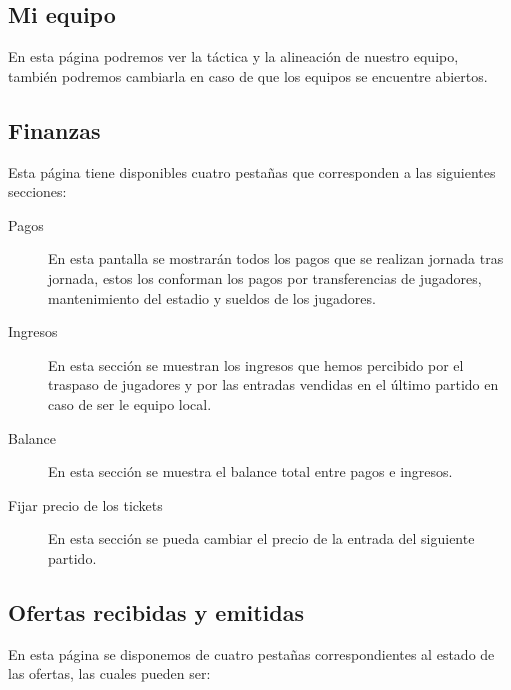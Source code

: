 \subsection{Mi equipo}
\label{sec:mi_equipo}
En esta página podremos ver la táctica y la alineación de nuestro equipo,
también podremos cambiarla en caso de que los equipos se encuentre abiertos.
\clearpage


\subsection{Finanzas}
\label{sec:finanzas}
Esta página tiene disponibles cuatro pestañas que corresponden a las siguientes
secciones:

\begin{description}
\item [Pagos] En esta pantalla se mostrarán todos los pagos que se realizan
  jornada tras jornada, estos los conforman los pagos por transferencias de
  jugadores, mantenimiento del estadio y sueldos de los jugadores.  \clearpage
\item[Ingresos] En esta sección se muestran los ingresos que hemos percibido por
  el traspaso de jugadores y por las entradas vendidas en el último partido en
  caso de ser le equipo local.
\item[Balance] En esta sección se muestra el balance total entre pagos e
  ingresos.  
\item[Fijar precio de los tickets] En esta sección se pueda cambiar el precio de
  la entrada del siguiente partido.
\end{description}

\subsection{Ofertas recibidas y emitidas}
\label{sec:ofertas}
En esta página se disponemos de cuatro pestañas correspondientes al estado de
las ofertas, las cuales pueden ser:


